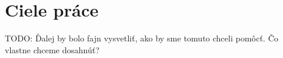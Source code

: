 \chapter{Ciele práce}
TODO: Ďalej by bolo fajn vysvetliť, ako by sme tomuto chceli pomôcť. Čo vlastne chceme dosahnúť?
